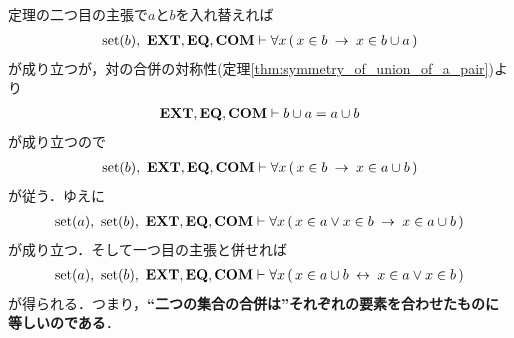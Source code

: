	定理の二つ目の主張で$a$と$b$を入れ替えれば
	\begin{align}
		\operatorname*{set} (b),\ \mbox{{\bf EXT}},\mbox{{\bf EQ}},\mbox{\bf COM} \vdash \forall x\, (\, x \in b \hspace{0.25em}\rightarrow\hspace{0.25em} x \in b \cup a\, )
	\end{align}
	が成り立つが，対の合併の対称性(定理\ref{thm:symmetry_of_union_of_a_pair})より
	\begin{align}
		\mbox{{\bf EXT}},\mbox{{\bf EQ}},\mbox{\bf COM} \vdash b \cup a = a \cup b
	\end{align}
	が成り立つので
	\begin{align}
		\operatorname*{set} (b),\ \mbox{{\bf EXT}},\mbox{{\bf EQ}},\mbox{\bf COM} \vdash \forall x\, (\, x \in b \hspace{0.25em}\rightarrow\hspace{0.25em} x \in a \cup b\, )
	\end{align}
	が従う．ゆえに
	\begin{align}
		\operatorname*{set} (a),\ \operatorname*{set} (b),\ \mbox{{\bf EXT}},\mbox{{\bf EQ}},\mbox{\bf COM} \vdash 
		\forall x\, (\, x \in a \vee x \in b \hspace{0.25em}\rightarrow\hspace{0.25em} x \in a \cup b\, )
	\end{align}
	が成り立つ．そして一つ目の主張と併せれば
	\begin{align}
		\operatorname*{set} (a),\ \operatorname*{set} (b),\ \mbox{{\bf EXT}},\mbox{{\bf EQ}},\mbox{\bf COM} \vdash 
		\forall x\, (\, x \in a \cup b \hspace{0.25em}\leftrightarrow\hspace{0.25em} x \in a \vee x \in b\, )
	\end{align}
	が得られる．つまり，{\bf ``二つの集合の合併は''それぞれの要素を合わせたものに等しいのである}．
	
